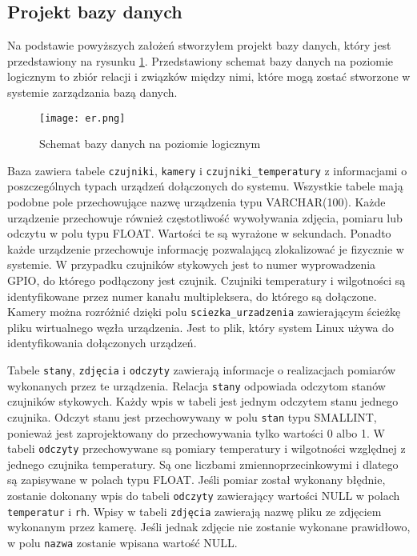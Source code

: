 \documentclass[a4paper,12pt,twoside]{article}
\begin{document}
\subsection{Projekt bazy danych}

Na podstawie powyższych założeń stworzyłem projekt bazy danych, który jest przedstawiony na rysunku \ref{fig: er}. Przedstawiony schemat bazy danych na poziomie logicznym to zbiór relacji i związków między nimi, które mogą zostać stworzone w systemie zarządzania bazą danych. 

\begin{figure}[h]
\texttt{[image: er.png]}
\caption{Schemat bazy danych na poziomie logicznym}
\label{fig: er}
\end{figure}

Baza zawiera tabele \texttt{czujniki}, \texttt{kamery} i \texttt{czujniki{\_}temperatury} z informacjami o poszczególnych typach urządzeń dołączonych do systemu. Wszystkie tabele mają podobne pole przechowujące nazwę urządzenia typu VARCHAR(100). Każde urządzenie przechowuje również częstotliwość wywoływania zdjęcia, pomiaru lub odczytu w polu typu FLOAT. Wartości te są wyrażone w sekundach. Ponadto każde urządzenie przechowuje informację pozwalającą zlokalizować je fizycznie w systemie. W przypadku czujników stykowych jest to numer wyprowadzenia GPIO, do którego podłączony jest czujnik. Czujniki temperatury i wilgotności są identyfikowane przez numer kanału multipleksera, do którego są dołączone. Kamery można rozróżnić dzięki polu \texttt{sciezka{\_}urzadzenia} zawierającym ścieżkę pliku wirtualnego węzła urządzenia. Jest to plik, który system Linux używa do identyfikowania dołączonych urządzeń. 

Tabele \texttt{stany}, \texttt{zdjęcia} i \texttt{odczyty} zawierają informacje o realizacjach pomiarów wykonanych przez te urządzenia. Relacja \texttt{stany} odpowiada odczytom stanów czujników stykowych. Każdy wpis w tabeli jest jednym odczytem  stanu jednego czujnika. Odczyt stanu jest przechowywany w polu \texttt{stan} typu SMALLINT, ponieważ jest zaprojektowany do przechowywania tylko wartości 0 albo 1. W tabeli \texttt{odczyty} przechowywane są pomiary temperatury i wilgotności względnej z jednego czujnika temperatury. Są one liczbami zmiennoprzecinkowymi i dlatego są zapisywane w polach typu FLOAT. Jeśli pomiar został wykonany błędnie, zostanie dokonany wpis do tabeli \texttt{odczyty} zawierający wartości NULL w polach \texttt{temperatur} i \texttt{rh}. Wpisy w tabeli \texttt{zdjęcia} zawierają nazwę pliku ze zdjęciem wykonanym przez kamerę. Jeśli jednak zdjęcie nie zostanie wykonane prawidłowo, w polu \texttt{nazwa} zostanie wpisana wartość NULL.
\end{document}
